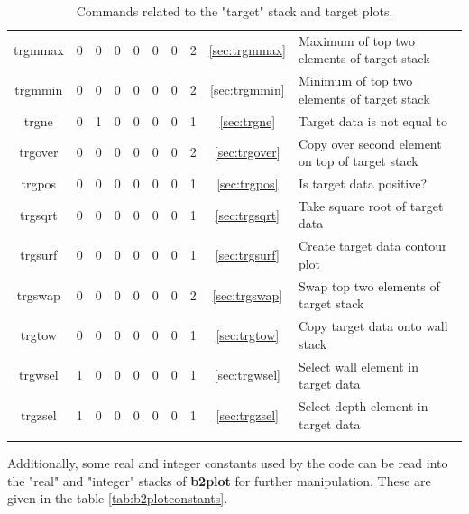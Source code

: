 \documentclass[a4paper,10pt]{report}
\newcommand{\btwoplot}{{\bf b2plot} }
\begin{document}
\begin{center}
\begin{longtable}{|c|c|c|c|c|c|c|c|c|l|}
    trgmmax \index{b2plot, trgmmax}  & 0 & 0 & 0 & 0 & 0 & 0 & 2 & \ref{sec:trgmmax}  & Maximum of top two elements of target stack \\
    trgmmin \index{b2plot, trgmmin}  & 0 & 0 & 0 & 0 & 0 & 0 & 2 & \ref{sec:trgmmin}  & Minimum of top two elements of target stack \\
    trgne \index{b2plot, trgne}    & 0 & 1 & 0 & 0 & 0 & 0 & 1 & \ref{sec:trgne}    & Target data is not equal to \\
    trgover \index{b2plot, trgover}  & 0 & 0 & 0 & 0 & 0 & 0 & 2 & \ref{sec:trgover}  & Copy over second element on top of target stack \\
    trgpos \index{b2plot, trgpos}   & 0 & 0 & 0 & 0 & 0 & 0 & 1 & \ref{sec:trgpos}   & Is target data positive? \\
    trgsqrt \index{b2plot, trgsqrt}  & 0 & 0 & 0 & 0 & 0 & 0 & 1 & \ref{sec:trgsqrt}  & Take square root of target data \\
    trgsurf \index{b2plot, trgsurf}  & 0 & 0 & 0 & 0 & 0 & 0 & 1 & \ref{sec:trgsurf}  & Create target data contour plot \\
    trgswap \index{b2plot, trgswap}  & 0 & 0 & 0 & 0 & 0 & 0 & 2 & \ref{sec:trgswap}  & Swap top two elements of target stack \\
    trgtow \index{b2plot, trgtow}   & 0 & 0 & 0 & 0 & 0 & 0 & 1 & \ref{sec:trgtow}   & Copy target data onto wall stack \\
    trgwsel \index{b2plot, trgwsel}  & 1 & 0 & 0 & 0 & 0 & 0 & 1 & \ref{sec:trgwsel}  & Select wall element in target data \\
    trgzsel \index{b2plot, trgzsel}  & 1 & 0 & 0 & 0 & 0 & 0 & 1 & \ref{sec:trgzsel}  & Select depth element in target data \\
    \hline
    \caption{Commands related to the "target" stack and target plots.}
    \label{tab:targetcommands}
  \end{longtable}
\end{center}

Additionally, some real and integer constants used by the code can be read
into the "real" and "integer" stacks of \btwoplot for further manipulation. These are given
in the table \ref{tab:b2plotconstants}.
\end{document}
